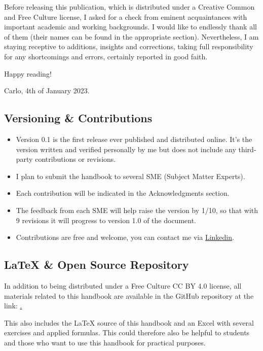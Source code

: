 \documentclass{article}
\begin{document}
Before releasing this publication, which is distributed under a Creative Common and Free Culture license, I asked for a check from eminent acquaintances with important academic and working backgrounds. I would like to endlessly thank all of them (their names can be found in the appropriate section). Nevertheless, I am staying receptive to additions, insights and corrections, taking full responsibility for any shortcomings and errors, certainly reported in good faith.

Happy reading! 

Carlo, 4th of January 2023.

\subsection{Versioning \& Contributions}
\begin{itemize}
    \item Version 0.1 is the first release ever published and distributed online. It's the version written and verified personally by me but does not include any third-party contributions or revisions. 
    \item I plan to submit the handbook to several SME (Subject Matter Experts). 
    \item Each contribution will be indicated in the Acknowledgments section. 
    \item The feedback from each SME will help raise the version by 1/10, so that with 9 revisions it will progress to version 1.0 of the document.
    \item Contributions are free and welcome, you can contact me via \href{https://www.linkedin.com/in/carloocchiena/}{Linkedin}. 
\end{itemize}


\subsection{\LaTeX{} \& Open Source Repository}
In addition to being distributed under a Free Culture CC BY 4.0 license, all materials related to this handbook are available in the GitHub repository at the link: \href{https://github.com/carloocchiena/the_statistics_handbook}.

This also includes the \LaTeX{} source of this handbook and an Excel with several exercises and applied formulas. This could therefore also be helpful to students and those who want to use this handbook for practical purposes. 

\clearpage
\end{document}

